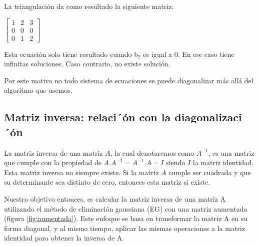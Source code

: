 La triangulación da como resultado la siguiente matriz:

\begin{center}
$\begin{bmatrix}
1 & 2 & 3\\
0 & 0 & 0\\
0 & 1 & 2
\end{bmatrix}$
\end{center}

Esta ecuación solo tiene resultado cuando b$_2$ es igual a 0. En ese caso tiene infinitas soluciones. Caso contrario, no existe solución.

Por este motivo no todo sistema de ecuaciones se puede diagonalizar más allá  del algoritmo que usemos.

\subsection{Matriz inversa: relaci´ón con la diagonalizaci´ón}
\label{opcionales}
\label{sec:inversa}

La matriz inversa de una matriz $A$, la cual denotaremos como $A^{-1}$, es una matriz que cumple con la propiedad de $A.A^{-1}=A^{-1}.A=I$ siendo $I$ la matriz identidad. Esta matriz inversa no siempre existe. Si la matriz $A$ cumple ser cuadrada y que su determinante \cite{Strang-determinante} sea distinto de cero, entonces esta matriz si existe.

Nuestro objetivo entonces, es calcular la matriz inversa de una matriz A utilizando el método de eliminación gaussiana (EG) con una matriz aumentada (figura \ref{fig:aumentada}). Este enfoque se basa en transformar la matriz A en su forma diagonal, y al mismo tiempo, aplicar las mismas operaciones a la matriz identidad para obtener la inversa de A.

